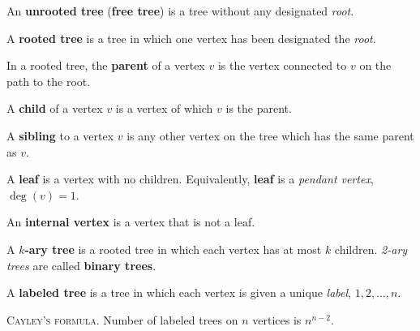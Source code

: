 \documentclass[a4paper,10pt]{article}
\newcommand{\op}[1]{\operatorname*{#1}}
\newcommand{\degree}[1]{\op{deg}(#1)}
\begin{document}
\begin{terms}
    \item An \textbf{unrooted tree} (\textbf{free tree}) is a tree without any designated \emph{root}.
    \item A \textbf{rooted tree} is a tree in which one vertex has been designated the \emph{root}.
    \begin{terms}
        \item In a rooted tree, the \textbf{parent} of a vertex $v$ is the vertex connected to $v$ on the path to the root.
        \item A \textbf{child} of a vertex $v$ is a vertex of which $v$ is the parent.
        \item A \textbf{sibling} to a vertex $v$ is any other vertex on the tree which has the same parent as $v$.


        \item A \textbf{leaf} is a vertex with no children. Equivalently, \textbf{leaf} is a \emph{pendant vertex}, \ie $\degree{v} = 1$.
        \item An \textbf{internal vertex} is a vertex that is not a leaf.

        \item A \textbf{$k$-ary tree} is a rooted tree in which each vertex has at most $k$ children. \emph{2-ary trees} are called \textbf{binary trees}.
    \end{terms}

    \item A \textbf{labeled tree} is a tree in which each vertex is given a unique \emph{label}, \eg $1, 2, \dotsc, n$.

    \item \textsc{Cayley's formula}. Number of labeled trees on $n$ vertices is $n^{n-2}$.


\end{terms}
\end{document}
